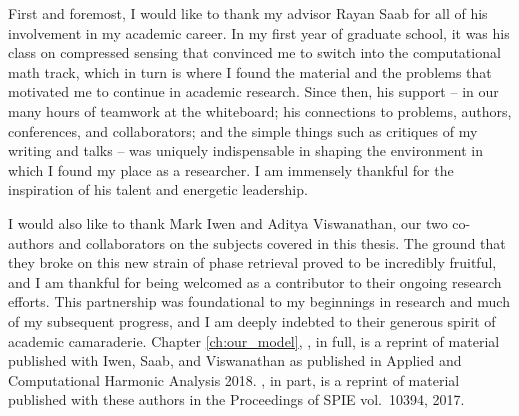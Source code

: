   First and foremost, I would like to thank my advisor Rayan Saab for all of his involvement in my academic career.  In my first year of graduate school, it was his class on compressed sensing that convinced me to switch into the computational math track, which in turn is where I found the material and the problems that motivated me to continue in academic research.  Since then, his support -- in our many hours of teamwork at the whiteboard; his connections to problems, authors, conferences, and collaborators; and the simple things such as critiques of my writing and talks -- was uniquely indispensable in shaping the environment in which I found my place as a researcher.  I am immensely thankful for the inspiration of his talent and energetic leadership.

  I would also like to thank Mark Iwen and Aditya Viswanathan, our two co-authors and collaborators on the subjects covered in this thesis.  The ground that they broke on this new strain of phase retrieval proved to be incredibly fruitful, and I am thankful for being welcomed as a contributor to their ongoing research efforts.  This partnership was foundational to my beginnings in research and much of my subsequent progress, and I am deeply indebted to their generous spirit of academic camaraderie.  Chapter \ref{ch:our_model}, , in full, is a reprint of material published with Iwen, Saab, and Viswanathan as published in Applied and Computational Harmonic Analysis 2018.   , in part, is a reprint of material published with these authors in the Proceedings of SPIE vol.~10394, 2017.
